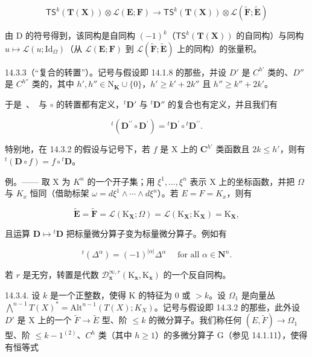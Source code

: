 \[
\mathsf {T S} ^ {k} (\mathbf {T} (\mathbf {X})) \otimes \mathscr {L} (\mathbf {E}; \mathbf {F}) \rightarrow \mathsf {T S} ^ {k} (\mathbf {T} (\mathbf {X})) \otimes \mathscr {L} (\tilde {\mathbf {F}}; \tilde {\mathbf {E}})
\]

由 D 的符号得到，该同构是自同构 \((-1)^{k}\)（\(\mathsf{T}\mathsf{S}^{k}(\mathbf{T}(\mathbf{X}))\) 的自同构）与同构 \(u\mapsto\mathcal{L}(u;\mathrm{Id}_{\Omega})\)（从 \(\mathcal{L}(\mathbf{E};\mathbf{F})\) 到 \(\mathcal{L}(\tilde{\mathbf{F}};\tilde{\mathbf{E}})\) 上的同构）的张量积。

14.3.3（“复合的转置”）。记号与假设即 14.1.8 的那些，并设 \(D'\) 是 \(C^{h'}\) 类的、\(D''\) 是 \(C^{h''}\) 类的，其中 \(h',h'' \in \mathrm{N}_{\mathbf{K}} \cup \{0\}\)，\(h' \geqslant k' + 2k''\) 且 \(h'' \geqslant k'' + 2k'\)。

于是 \,、\, 与 \(\circ\) 的转置都有定义，\(^t\mathbf{D}'\) 与 \(^t\mathbf{D}''\) 的复合也有定义，并且我们有

\[
{ } ^ { t } ( \mathbf { D } ^ { \prime \prime } \circ \mathbf { D } ^ { \prime } ) = { } ^ { t } \mathbf { D } ^ { \prime } \circ { } ^ { t } \mathbf { D } ^ { \prime \prime } .
\]

特别地，在 14.3.2 的假设与记号下，若 \(f\) 是 X 上的 \(\mathbf{C}^{h'}\) 类函数且 \(2k \leqslant h'\)，则有 \({}^t(\mathbf{D} \circ f) = f \circ {}^t\mathbf{D}\)。

例。—— 取 X 为 \(K^{n}\) 的一个开子集；用 \(\xi^{1}, \ldots, \xi^{n}\) 表示 X 上的坐标函数，并把 \(\Omega\) 与 \(K_{x}\) 恒同（借助标架 \(\omega = d\xi^{1} \wedge \cdots \wedge d\xi^{n}\)）。若 \(E = F = K_{x}\)，则有

\[
\tilde {\mathbf {E}} = \tilde {\mathbf {F}} = \mathcal {L} (\mathrm{K}_{\mathbf{X}}; \Omega) = \mathcal {L} (\mathrm{K}_{\mathbf{X}}; \mathrm{K}_{\mathbf{X}}) = \mathrm{K}_{\mathbf{X}},
\]

且运算 \(\mathbf{D} \mapsto {}^{t}\mathbf{D}\) 把标量微分算子变为标量微分算子。例如有

\[
{ } ^ { t } ( \Delta ^ { \alpha } ) = ( - 1 ) ^ { | \alpha | } \Delta ^ { \alpha } \quad \text { for all } \alpha \in \mathbf {N} ^ { n } .
\]

若 \(r\) 是无穷，转置是代数 \(\mathcal{D}_{\mathbf{x}}^{\infty,r}(\mathrm{K}_{\mathbf{x}},\mathrm{K}_{\mathbf{x}})\) 的一个反自同构。

14.3.4. 设 \(k\) 是一个正整数，使得 K 的特征为 0 或 \(>k\)。设 \(\Omega_{1}\) 是向量丛 \(\bigwedge^{n-1}T(X)^{*} = \text{Alt}^{n-1}(T(X); K_{X})\)。记号与假设即 14.3.2 的那些，此外设 \(D'\) 是 X 上的一个 \(\widetilde{F} \to \widetilde{E}\) 型、阶 \(\leqslant k\) 的微分算子。我们称任何 \((E, \widetilde{F}) \to \Omega_{1}\) 型、阶 \(\leqslant k - 1^{(2)}\)、\(C^{h}\) 类（其中 \(h \geqslant 1\)）的多微分算子 G（参见 14.1.11），使得有恒等式

